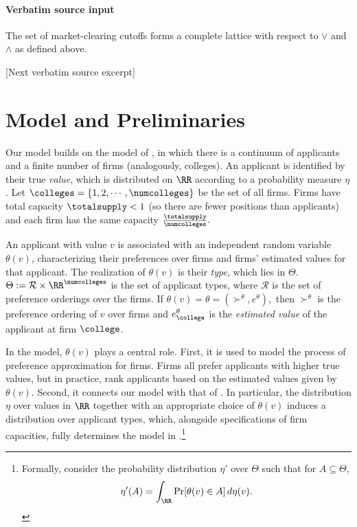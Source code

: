 \documentclass[10pt]{article}
\begin{document}
\paragraph{Verbatim source input}
\begin{ReviewVerbatim}
\begin{proposition}\label{prop:lattice}
The set of market-clearing cutoffs forms a complete lattice with respect to $\vee$ and $\wedge$ as defined above.
\end{proposition}

[Next verbatim source excerpt]

\section{Model and Preliminaries}
Our model builds on the model of \cite{azevedo2016supply}, in which there is a continuum of applicants and a finite number of firms (analogously, colleges). An applicant is identified by their true \textit{value}, which is distributed on $\RR$ according to a probability measure $\eta$. Let $\colleges = \{1, 2, \cdots, \numcolleges\}$ be the set of all firms. Firms have total capacity $\totalsupply < 1$ (so there are fewer positions than applicants) and each firm has the same capacity $\frac{\totalsupply}{\numcolleges}.$

An applicant with value $v$ is associated with an independent random variable $\theta(v)$, characterizing their preferences over firms and firms' estimated values for that applicant. The realization of $\theta(v)$ is their \textit{type}, which lies in $\Theta$. $\Theta := \mathcal{R} \times \RR^\numcolleges$ is the set of applicant types, where $\mathcal{R}$ is the set of preference orderings over the firms. If $\theta(v) = \theta = (\succ^\theta, e^\theta),$ then $\succ^\theta$ is the preference ordering of $v$ over firms and $e^\theta_\college$ is the \textit{estimated value} of the applicant at firm $\college$.

In the model, $\theta(v)$ plays a central role. First, it is used to model the process of preference approximation for firms. Firms all prefer applicants with higher true values, but in practice, rank applicants based on the estimated values given by $\theta(v)$. Second, it connects our model with that of \cite{azevedo2016supply}. In particular, the distribution $\eta$ over values in $\RR$ together with an appropriate choice of $\theta(v)$ induces a distribution over applicant types, which, alongside specifications of firm capacities, fully determines the model in \cite{azevedo2016supply}.\footnote{Formally, consider the probability distribution $\eta'$ over $\Theta$ such that for $A\subseteq \Theta$,
\begin{equation}
    \eta'(A) = \int_\RR \Pr[\theta(v)\in A]\,d\eta(v).
\end{equation}}


\end{ReviewVerbatim}
\end{document}
